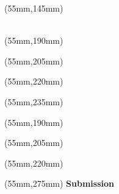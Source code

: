 \begin{titlepage}
\begin{textblock*}{120mm}(55mm,145mm)
    \noindent
    \Large\textsf{\textcolor{titlecolor}{
    \textbf{\authorName} \\
    \authorDepartment\\
    \authorChair
    }}
\end{textblock*}

\ifdefined\advisorTwoName
\begin{textblock*}{120mm}(55mm,190mm)
	\noindent
	\Large\textsf{\textcolor{titlecolor}{
			\textbf{\reviewerOneName} \\
			\reviewerOneTask
	}}
\end{textblock*}


\begin{textblock*}{120mm}(55mm,205mm)
	\noindent
	\Large\textsf{\textcolor{titlecolor}{
			\textbf{\advisorOneName} \\
			\advisorOneTask
	}}
\end{textblock*}

\begin{textblock*}{120mm}(55mm,220mm)
	\noindent
	\Large\textsf{\textcolor{titlecolor}{
			\textbf{\advisorTwoName} \\
			\advisorTwoTask
	}}
\end{textblock*}

\ifdefined\advisorExtName
	\begin{textblock*}{120mm}(55mm,235mm)
		\noindent
		\Large\textsf{\textcolor{titlecolor}{
			\textbf{\advisorExtName} \\
			\advisorExtTask
		}}
	\end{textblock*}
\fi	
	
\else
	\begin{textblock*}{120mm}(55mm,190mm)
		\noindent
		\Large\textsf{\textcolor{titlecolor}{
				\textbf{\reviewerOneName} \\
				\reviewerOneTask
		}}
	\end{textblock*}
	
	\begin{textblock*}{120mm}(55mm,205mm)
		\noindent
		\Large\textsf{\textcolor{titlecolor}{
				\textbf{\advisorOneName} \\
				\advisorOneTask
		}}
	\end{textblock*}
\ifdefined\advisorExtName
	\begin{textblock*}{120mm}(55mm,220mm)
		\noindent
		\Large\textsf{\textcolor{titlecolor}{
			\textbf{\advisorExtName} \\
			\advisorExtTask
		}}
	\end{textblock*}
\fi
\fi
\begin{textblock*}{60mm}(55mm,275mm)
    \noindent
    \Large\textsf{\textcolor{titlecolor}{\textbf{Submission\\}\submissionTime}}
\end{textblock*}


\end{titlepage}

